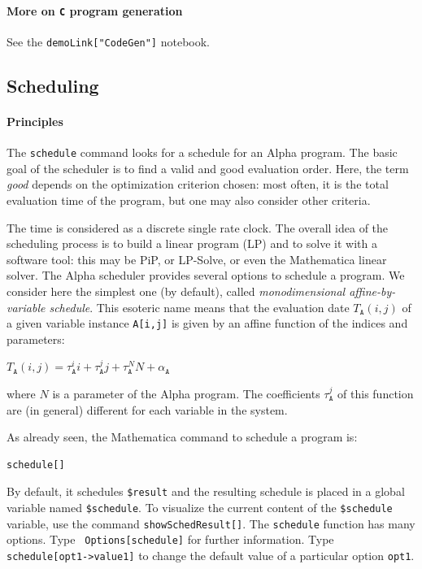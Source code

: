 \documentclass[12pt]{article}
\newcommand{\C}{\texttt{C}}
\newcommand{\pip}{PiP}
\newcommand{\lpsolve}{LP-Solve}
\newcommand{\Alpha}{{\sc Alpha}}
\newcommand{\alfa}{\Alpha}
\newcommand{\mma}{{Mathematica}}
\begin{document}
\paragraph*{More on \C{} program generation}
See the \texttt{demoLink["CodeGen"]} notebook. 
\subsection{Scheduling}
\label{schedule}

\paragraph*{Principles}
The {\tt schedule} command looks for a schedule for an {\Alpha}
program.  The basic goal of the scheduler is to find a valid and good
evaluation order. Here, the term {\em good} depends on the
optimization criterion chosen: most often, it is the total evaluation
time of the program, but one may also consider other criteria.

The time is considered as a discrete single rate clock. The overall
idea of the scheduling process is to build a linear program
(LP) and to solve it with a software tool: 
this may be \pip{}\cite{FeautrierTa90}, or \lpsolve{}, or even the \mma{}
linear solver. 
\index{Pip@\pip{}}
\index{LPSolve@\lpsolve{}}
The \alfa{} scheduler provides several options to schedule 
a program. We consider here 
the simplest one (by default), called 
{\em  monodimensional affine-by-variable schedule}. 
This esoteric name means 
that the evaluation date $T_{\texttt{A}}(i,j)$ of a given variable
instance 
\texttt{A[i,j]}  
is given by an affine
function of the indices and parameters:\\
\centerline{ $T_{{\texttt{A}}}(i,j) =
\tau^i_{{\texttt{A}}} i + \tau^j_{{\texttt{A}}} j+ \tau^N_{{\texttt{A}}} N +
\alpha_{{\texttt{A}}}$} where $N$ is a 
parameter of the {\Alpha} program.
The coefficients $\tau^j_{{\texttt{A}}}$ of this function
are (in general) different for each variable in the system.

As already seen, 
the \mma{} command to schedule a program is:
\begin{verbatim}
schedule[]
\end{verbatim}
By
default, it schedules {\tt \$result} and the resulting schedule is
placed in a global variable named {\tt \$schedule}.  
To visualize the current content of the \texttt{\$schedule} variable, 
use the command \texttt{showSchedResult[]}.
The
\texttt{schedule} function has many options. 
Type {\tt
Options[schedule]} for further information. Type {\tt
schedule[opt1->value1]} to change the default value of a particular
option {\tt opt1}.
\end{document}
